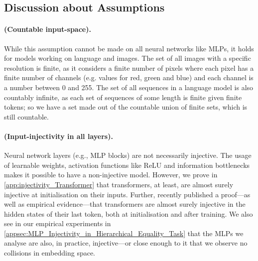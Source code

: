 \subsection{Discussion about Assumptions}
\label{appsubsec:Linear_Representation_Hypothesis_vs_DAS_Assumptions}

\paragraph{ (Countable input-space).}
While this assumption cannot be made on all neural networks like MLPs, it holds for models working on language and images. 
The set of all images with a specific resolution is finite, as it considers a finite number of pixels where each pixel has a finite number of channels (e.g. values for red, green and blue) and each channel is a number between 0 and 255.
The set of all sequences in a language model is also countably infinite, as each set of sequences of some length is finite given finite tokens; so we have a set made out of the countable union of finite sets, which is still countable.

\paragraph{ (Input-injectivity in all layers).}
Neural network layers (e.g., MLP blocks) are not necessarily injective.
The usage of learnable weights, activation functions like ReLU \citep{Nair2010RectifiedLU} and information bottlenecks makes it possible to have a non-injective model.
However, we prove in \cref{app:injectivity_Transformer} that transformers, at least, are almost surely injective at initialisation on their inputs. Further, \citet{nikolaou2025languagemodelsinjectiveinvertible} recently published a proof---as well as empirical evidence---that transformers are almost surely injective in the hidden states of their last token, both at initialisation and after training.
We also see in our empirical experiments in \cref{appsec:MLP_Injectivity_in_Hierarchical_Equality_Task} that the MLPs we analyse are also, in practice, injective---or close enough to it that we observe no collisions in embedding space.

